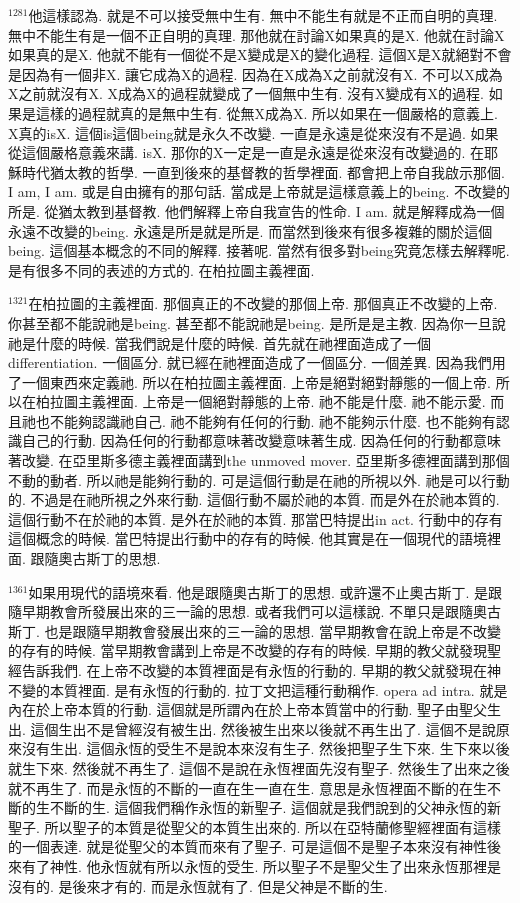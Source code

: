 \documentclass{book}
\begin{document}
$^{1281}$他這樣認為.
就是不可以接受無中生有.
無中不能生有就是不正而自明的真理.
無中不能生有是一個不正自明的真理.
那他就在討論X如果真的是X.
他就在討論X如果真的是X.
他就不能有一個從不是X變成是X的變化過程.
這個X是X就絕對不會是因為有一個非X.
讓它成為X的過程.
因為在X成為X之前就沒有X.
不可以X成為X之前就沒有X.
X成為X的過程就變成了一個無中生有.
沒有X變成有X的過程.
如果是這樣的過程就真的是無中生有.
從無X成為X.
所以如果在一個嚴格的意義上.
X真的isX.
這個is這個being就是永久不改變.
一直是永遠是從來沒有不是過.
如果從這個嚴格意義來講.
isX.
那你的X一定是一直是永遠是從來沒有改變過的.
在耶穌時代猶太教的哲學.
一直到後來的基督教的哲學裡面.
都會把上帝自我啟示那個.
I am, I am.
或是自由擁有的那句話.
當成是上帝就是這樣意義上的being.
不改變的所是.
從猶太教到基督教.
他們解釋上帝自我宣告的性命.
I am.
就是解釋成為一個永遠不改變的being.
永遠是所是就是所是.
而當然到後來有很多複雜的關於這個being.
這個基本概念的不同的解釋.
接著呢.
當然有很多對being究竟怎樣去解釋呢.
是有很多不同的表述的方式的.
在柏拉圖主義裡面.

$^{1321}$在柏拉圖的主義裡面.
那個真正的不改變的那個上帝.
那個真正不改變的上帝.
你甚至都不能說祂是being.
甚至都不能說祂是being.
是所是是主教.
因為你一旦說祂是什麼的時候.
當我們說是什麼的時候.
首先就在祂裡面造成了一個differentiation.
一個區分.
就已經在祂裡面造成了一個區分.
一個差異.
因為我們用了一個東西來定義祂.
所以在柏拉圖主義裡面.
上帝是絕對絕對靜態的一個上帝.
所以在柏拉圖主義裡面.
上帝是一個絕對靜態的上帝.
祂不能是什麼.
祂不能示愛.
而且祂也不能夠認識祂自己.
祂不能夠有任何的行動.
祂不能夠示什麼.
也不能夠有認識自己的行動.
因為任何的行動都意味著改變意味著生成.
因為任何的行動都意味著改變.
在亞里斯多德主義裡面講到the unmoved mover.
亞里斯多德裡面講到那個不動的動者.
所以祂是能夠行動的.
可是這個行動是在祂的所視以外.
祂是可以行動的.
不過是在祂所視之外來行動.
這個行動不屬於祂的本質.
而是外在於祂本質的.
這個行動不在於祂的本質.
是外在於祂的本質.
那當巴特提出in act.
行動中的存有這個概念的時候.
當巴特提出行動中的存有的時候.
他其實是在一個現代的語境裡面.
跟隨奧古斯丁的思想.

$^{1361}$如果用現代的語境來看.
他是跟隨奧古斯丁的思想.
或許還不止奧古斯丁.
是跟隨早期教會所發展出來的三一論的思想.
或者我們可以這樣說.
不單只是跟隨奧古斯丁.
也是跟隨早期教會發展出來的三一論的思想.
當早期教會在說上帝是不改變的存有的時候.
當早期教會講到上帝是不改變的存有的時候.
早期的教父就發現聖經告訴我們.
在上帝不改變的本質裡面是有永恆的行動的.
早期的教父就發現在神不變的本質裡面.
是有永恆的行動的.
拉丁文把這種行動稱作.
opera ad intra.
就是內在於上帝本質的行動.
這個就是所謂內在於上帝本質當中的行動.
聖子由聖父生出.
這個生出不是曾經沒有被生出.
然後被生出來以後就不再生出了.
這個不是說原來沒有生出.
這個永恆的受生不是說本來沒有生子.
然後把聖子生下來.
生下來以後就生下來.
然後就不再生了.
這個不是說在永恆裡面先沒有聖子.
然後生了出來之後就不再生了.
而是永恆的不斷的一直在生一直在生.
意思是永恆裡面不斷的在生不斷的生不斷的生.
這個我們稱作永恆的新聖子.
這個就是我們說到的父神永恆的新聖子.
所以聖子的本質是從聖父的本質生出來的.
所以在亞特蘭修聖經裡面有這樣的一個表達.
就是從聖父的本質而來有了聖子.
可是這個不是聖子本來沒有神性後來有了神性.
他永恆就有所以永恆的受生.
所以聖子不是聖父生了出來永恆那裡是沒有的.
是後來才有的.
而是永恆就有了.
但是父神是不斷的生.
\end{document}
